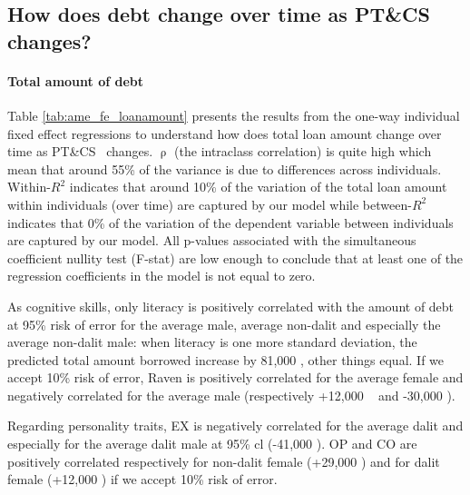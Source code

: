 \documentclass[a4paper, 11pt, onecolumn]{article}
\newcommand{\sd}{standard deviation}
\newcommand{\ote}{other things equal}
\newcommand{\PTCS}{PT\&CS}
\begin{document}



	\subsection{How does debt change over time as \PTCS~ changes?}

\paragraph{Total amount of debt}
Table \ref{tab:ame_fe_loanamount} presents the results from the one-way individual fixed effect regressions to understand how does total loan amount change over time as \PTCS~ changes.
$\uprho$ (the intraclass correlation) is quite high which mean that around 55\% of the variance is due to differences across individuals. 
Within-$R^2$ indicates that around 10\% of the variation of the total loan amount within individuals (over time) are captured by our model while between-$R^2$ indicates that 0\% of the variation of the dependent variable between individuals are captured by our model.
All p-values associated with the simultaneous coefficient nullity test (F-stat) are low enough to conclude that at least one of the regression coefficients in the model is not equal to zero.

As cognitive skills, only literacy is positively correlated with the amount of debt at 95\% risk of error for the average male, average non-dalit and especially the average non-dalit male: when literacy is one more \sd, the predicted total amount borrowed increase by 81,000 \rupee, \ote.
If we accept 10\% risk of error, Raven is positively correlated for the average female and negatively correlated for the average male (respectively +12,000 \rupee~ and -30,000 \rupee).

Regarding personality traits, EX is negatively correlated for the average dalit and especially for the average dalit male at 95\% cl (-41,000 \rupee).
OP and CO are positively correlated respectively for non-dalit female (+29,000 \rupee) and for dalit female (+12,000 \rupee) if we accept 10\% risk of error.
\end{document}
